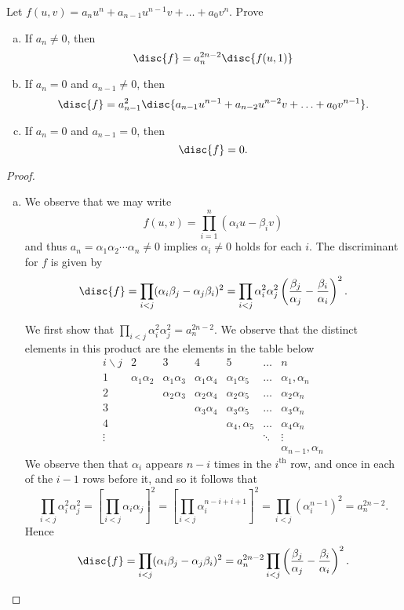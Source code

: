 \documentclass[10pt]{amsart}
\begin{document}
\begin{thm}
  Let $f(u,v) = a_nu^n + a_{n-1}u^{n-1}v + \ldots + a_0v^n$.
  Prove
  \begin{enumerate}[(a)]
    \item
      If $a_n \neq 0$, then
      $$\disc{f} = a_n^{2n - 2}\disc{f(u,1)}$$
    \item
      If $a_n = 0$ and $a_{n-1} \neq 0$, then
      $$\disc{f} = a_{n-1}^2 \disc{a_{n-1}u^{n-1} + a_{n-2}u^{n-2}v + \ldots + a_0v^{n-1}}.$$
    \item
      If $a_n = 0$ and $a_{n-1} = 0$, then
      $$\disc{f} = 0.$$
  \end{enumerate}
  
  \begin{proof}
    \begin{enumerate}[(a)]
    \item\label{1.a}
      We observe that we may write 
      $$f(u,v) = \prod_{i = 1}^n (\alpha_iu - \beta_iv)$$
      and thus $a_n = \alpha_1\alpha_2 \cdots \alpha_n \neq 0$ implies $\alpha_i \neq 0$ holds for each $i$.
      The discriminant for $f$ is given by
      $$\disc{f} = \prod_{i < j} (\alpha_i\beta_j - \alpha_j\beta_i)^2 = \prod_{i < j} \alpha_i^2\alpha_j^2\left(\frac{\beta_j}{\alpha_j} - \frac{\beta_i}{\alpha_i}\right)^2.$$
      
      We first show that $\prod_{i < j} \alpha_i^2\alpha_j^2 = a_n^{2n - 2}$.
      We observe that the distinct elements in this product are the elements in the table below
      $$\begin{array}{c||cccccc}
        i \backslash j & 2 & 3 & 4 & 5 & \ldots &n\\
        \hline
        1 &  \alpha_1\alpha_2 & \alpha_1\alpha_3 & \alpha_1\alpha_4 & \alpha_1\alpha_5 & \ldots & \alpha_1,\alpha_n\\
        2 && \alpha_2\alpha_3 & \alpha_2\alpha_4 & \alpha_2\alpha_5 & \ldots & \alpha_2\alpha_n\\
        3 &&       & \alpha_3\alpha_4 & \alpha_3\alpha_5 & \ldots & \alpha_3\alpha_n\\
        4 &&       &       & \alpha_4,\alpha_5 & \ldots & \alpha_4\alpha_n\\
        \vdots &&       &       &       & \ddots & \vdots\\
        &&&&&&\alpha_{n-1},\alpha_n
      \end{array}$$
      We observe then that $\alpha_i$ appears $n - i$ times in the $i^\text{th}$ row, and once in each of the $i - 1$ rows before it, and so it follows that
      $$\prod_{i < j} \alpha_i^2\alpha_j^2 = \left[\prod_{i < j} \alpha_i\alpha_j\right]^2 = \left[\prod_{i < j} \alpha_i^{n-i + i + 1}\right]^2 = \prod_{i < j}(\alpha_i^{n-1})^2 = a_n^{2n-2}.$$
      Hence 
      $$\disc{f} = \prod_{i < j} (\alpha_i\beta_j - \alpha_j\beta_i)^2 = a_n^{2n-2}\prod_{i < j} \left(\frac{\beta_j}{\alpha_j} - \frac{\beta_i}{\alpha_i}\right)^2.$$
      

\end{enumerate}
\end{proof}
\end{thm}
\end{document}
